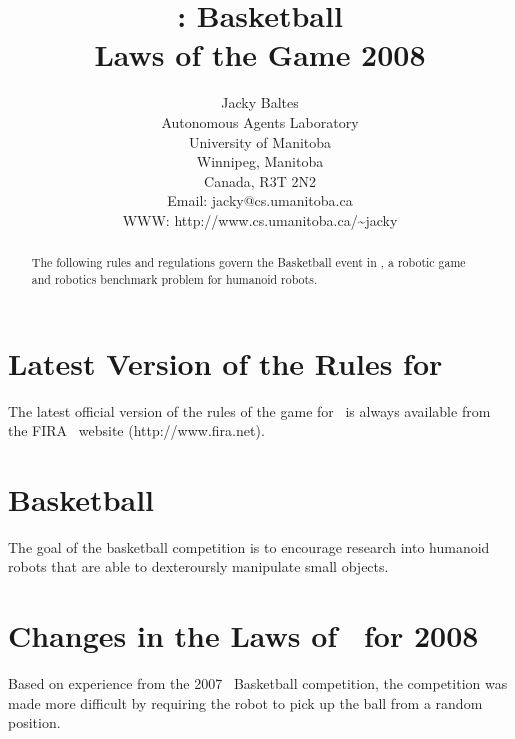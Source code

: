 \documentclass[12pt]{hurocup}
\begin{document}
\title{\HuroCup: Basketball\\
  Laws of the Game 2008}


\author{Jacky Baltes\\
Autonomous Agents Laboratory\\
University of Manitoba\\
Winnipeg, Manitoba\\
Canada, R3T 2N2\\
Email: jacky@cs.umanitoba.ca\\
WWW: http://www.cs.umanitoba.ca/\~{ }jacky
}

\maketitle


\begin{abstract}
The following rules and regulations govern the Basketball event in
\HuroCup, a robotic game and robotics benchmark problem for humanoid
robots.
%
\end{abstract}

\section*{Latest Version of the Rules for \HuroCup}
\label{sec:updates}

The latest official version of the rules of the game for \HuroCup\ is
always available from the FIRA \HuroCup\ website (http://www.fira.net).

\newpage

\section{Basketball}
\label{sec:basketball} 

The goal of the basketball competition is to encourage research into
humanoid robots that are able to dexteroursly manipulate small
objects.

\section{Changes in the Laws of \HuroCup\ for 2008}

Based on experience from the 2007 \HuroCup\ Basketball competition,
the competition was made more difficult by requiring the robot to pick
up the ball from a random position.
\end{document}
